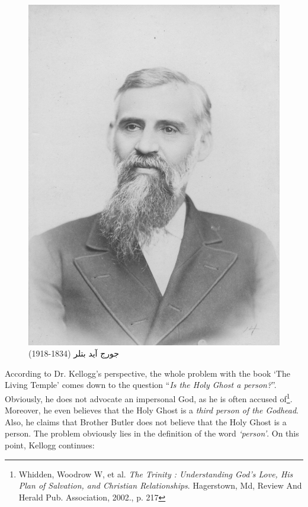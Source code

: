 \begin{figure}[hp]
    \centering
    \includegraphics[width=1\linewidth]{images/george-ide-butler.jpg}
    \caption*{جورج آيد بتلر (1834-1918)}
    \label{fig:g-i-butler}
\end{figure}


According to Dr. Kellogg’s perspective, the whole problem with the book ‘The Living Temple’ comes down to the question “\textit{Is the Holy Ghost a person?}”. Obviously, he does not advocate an impersonal God, as he is often accused of\footnote{Whidden, Woodrow W, et al. \textit{The Trinity : Understanding God's Love, His Plan of Salvation, and Christian Relationships}. Hagerstown, Md, Review And Herald Pub. Association, 2002., p. 217}. Moreover, he even believes that the Holy Ghost is a \textit{third person of the Godhead}. Also, he claims that Brother Butler does not believe that the Holy Ghost is a person. The problem obviously lies in the definition of the word \textit{‘person’}. On this point, Kellogg continues:


